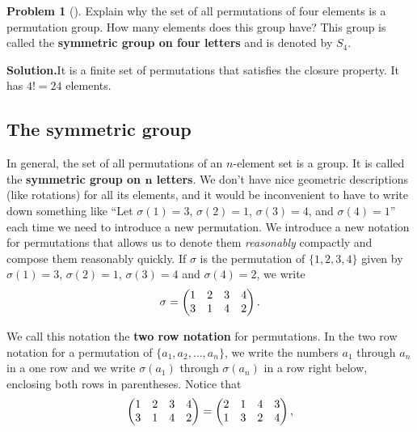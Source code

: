 \documentclass[10pt,]{book}
\newcommand{\terminology}[1]{\textbf{#1}}
\theoremstyle{plain}
\theoremstyle{definition}
\newtheorem{activity}[project]{Problem}
\theoremstyle{definition}
\numberwithin{equation}{chapter}
\newcommand{\amp}{&}
\begin{document}
\begin{activity}[]\label{activity-257}
Explain why the set of all permutations of four elements is a permutation group. How many elements does this group have? This group is called the \terminology{symmetric group on four letters} and is denoted by \(S_4\).%
\par\medskip\noindent%
\textbf{Solution.}\quad It is a finite set of permutations that satisfies the closure property. It has \(4!= 24\) elements.%
\end{activity}
\typeout{************************************************}
\typeout{************************************************}
\subsection[{The symmetric group}]{The symmetric group}\label{subsection-52}
In general, the set of all permutations of an \(n\)-element set is a group. It is called the \terminology{symmetric group on \(\mathbf n\) letters}. We don't have nice geometric descriptions (like rotations) for all its elements, and it would be inconvenient to have to write down something like ``Let \(\sigma(1) =3\), \(\sigma(2) =1\), \(\sigma(3)=4\), and \(\sigma(4)=1\)'' each time we need to introduce a new permutation. We introduce a new notation for permutations that allows us to denote them \emph{reasonably} compactly and compose them reasonably quickly. If \(\sigma\) is the permutation of \(\{1,2,3,4\}\) given by \(\sigma(1)=3\), \(\sigma(2)=1\), \(\sigma(3) =4\) and \(\sigma(4) =2\), we write%
\begin{equation*}
\sigma =\left( \begin{matrix}1\amp 2\amp 3\amp 4\cr3\amp 1\amp 4\amp 2
\end{matrix} \right).
\end{equation*}
%
\par
We call this notation the \terminology{two row notation} for permutations. In the two row notation for a permutation of \(\{a_1,a_2,\ldots, a_n\}\), we write the numbers \(a_1\) through \(a_n\) in a one row and we write \(\sigma(a_1)\) through \(\sigma(a_n)\) in a row right below, enclosing both rows in parentheses. Notice that%
\begin{equation*}
\left( \begin{matrix}1\amp 2\amp 3\amp 4\cr3\amp 1\amp 4\amp 2
\end{matrix} \right) = \left(
\begin{matrix}2\amp 1\amp 4\amp 3\cr1\amp 3\amp 2\amp 4
\end{matrix} \right),
\end{equation*}
\end{document}
